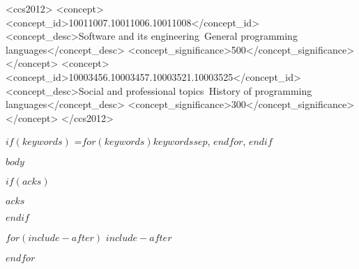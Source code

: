 \documentclass[sigplan,10pt$if(review)$,review,anonymous$endif$]{acmart}\settopmatter{printfolios=true,printccs=false,printacmref=false}
\begin{document}
\begin{CCSXML}
<ccs2012>
<concept>
<concept_id>10011007.10011006.10011008</concept_id>
<concept_desc>Software and its engineering~General programming languages</concept_desc>
<concept_significance>500</concept_significance>
</concept>
<concept>
<concept_id>10003456.10003457.10003521.10003525</concept_id>
<concept_desc>Social and professional topics~History of programming languages</concept_desc>
<concept_significance>300</concept_significance>
</concept>
</ccs2012>
\end{CCSXML}



$if(keywords)$
\keywords={$for(keywords)$$keywords$$sep$, $endfor$},
$endif$


\maketitle


$body$


$if(acks)$
\begin{acks}                            %
$acks$
\end{acks}
$endif$



$for(include-after)$
$include-after$

$endfor$
\end{document}
